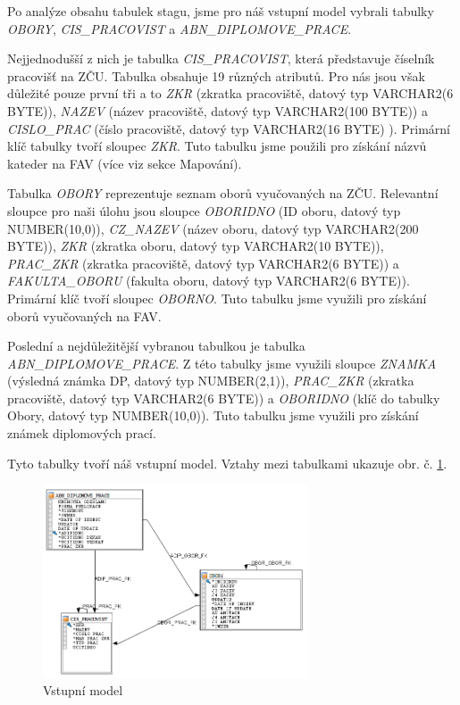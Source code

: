 Po analýze obsahu tabulek stagu, jsme pro náš vstupní model vybrali tabulky \textit{OBORY}, \textit{CIS\_PRACOVIST} a \textit{ABN\_DIPLOMOVE\_PRACE}. 

Nejjednodušší z nich je tabulka \textit{CIS\_PRACOVIST}, která představuje číselník pracovišť na ZČU. Tabulka obsahuje 19 různých atributů. Pro nás jsou však důležité pouze první tři a to \textit{ZKR} (zkratka pracoviště, datový typ VARCHAR2(6 BYTE)), \textit{NAZEV} (název pracoviště, datový typ VARCHAR2(100 BYTE)) a \textit{CISLO\_PRAC} (číslo pracoviště, datový typ VARCHAR2(16 BYTE) ). Primární klíč tabulky tvoří sloupec \textit{ZKR}. Tuto tabulku jsme použili pro získání názvů kateder na FAV (více viz sekce Mapování). 

Tabulka \textit{OBORY} reprezentuje seznam oborů vyučovaných na ZČU. Relevantní sloupce pro naši úlohu jsou sloupce \textit{OBORIDNO} (ID oboru, datový typ NUMBER(10,0)), \textit{CZ\_NAZEV} (název oboru, datový typ VARCHAR2(200 BYTE)), \textit{ZKR} (zkratka oboru, datový typ VARCHAR2(10 BYTE)), \textit{PRAC\_ZKR} (zkratka pracoviště, datový typ VARCHAR2(6 BYTE)) a \textit{FAKULTA\_OBORU} (fakulta oboru, datový typ VARCHAR2(6 BYTE)). Primární klíč tvoří sloupec \textit{OBORNO}. Tuto tabulku jsme využili pro získání oborů vyučovaných na FAV. 

Poslední a nejdůležitější vybranou tabulkou je tabulka \textit{ABN\_DIPLOMOVE\_PRACE}. 
Z této tabulky jsme využili sloupce \textit{ZNAMKA} (výsledná známka DP, datový typ NUMBER(2,1)),  \textit{PRAC\_ZKR} (zkratka pracoviště, datový typ VARCHAR2(6 BYTE)) a \textit{OBORIDNO} (klíč do tabulky Obory, datový typ NUMBER(10,0)). Tuto tabulku jsme využili pro získání známek diplomových prací. 

Tyto tabulky tvoří náš vstupní model. Vztahy mezi tabulkami ukazuje obr. č. \ref{fig:src-model}. 

\begin{figure}[htb]
    \centering
    \includegraphics[width=0.7\textwidth]{graphs/src-model.png}
    \caption{Vstupní model}
    \label{fig:src-model}
\end{figure}
\FloatBarrier


